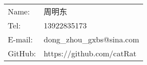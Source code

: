 \begin{tabular}{ll}
  Name: & 周明东 \\
  Tel: & 13922835173 \\
  E-mail: & dong\_zhou\_gxbs@sina.com \\
  GitHub: & https://github.com/catRat
\end{tabular}
